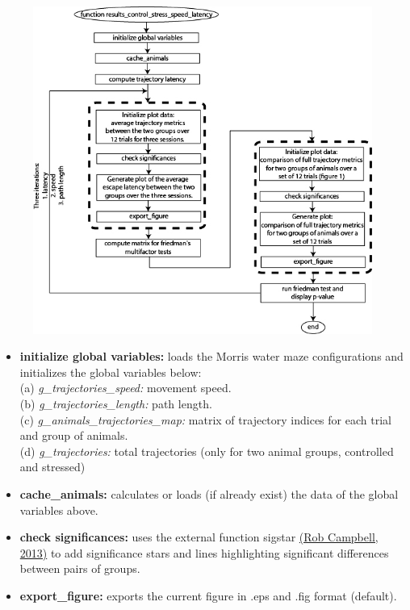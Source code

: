 \documentclass[12pt,titlepage]{article}
\begin{document}
\begin{doublespace}
\begin{figure}[H]
	\begin{center}
		\includegraphics[width=0.99\textwidth]{results_control_stress_speed_latency.jpg}
		\label{fig1}
	\end{center}
\end{figure}

\begin{itemize}
	\item\textbf{initialize global variables:} loads the Morris water maze configurations and initializes the global variables below:\\
	 (a) \textit{g\_trajectories\_speed:} movement speed.\\
	 (b) \textit{g\_trajectories\_length:} path length.\\
	 (c) \textit{g\_animals\_trajectories\_map:} matrix of trajectory indices for each trial and group of animals.\\
	 (d) \textit{g\_trajectories:} total trajectories (only for two animal groups, controlled and stressed)
	\item\textbf{cache\_animals:} calculates or loads (if already exist) the data of the global variables above.
	\item\textbf{check significances:} uses the external function sigstar \href{http://www.mathworks.com/matlabcentral/fileexchange/39696-sigstar-groups-stats-nosort-}{(Rob Campbell, 2013)} to add significance stars and lines highlighting significant differences between pairs of groups.
	\item\textbf{export\_figure:} exports the current figure in .eps and .fig format (default).
\end{itemize}


\end{doublespace}
\end{document}
